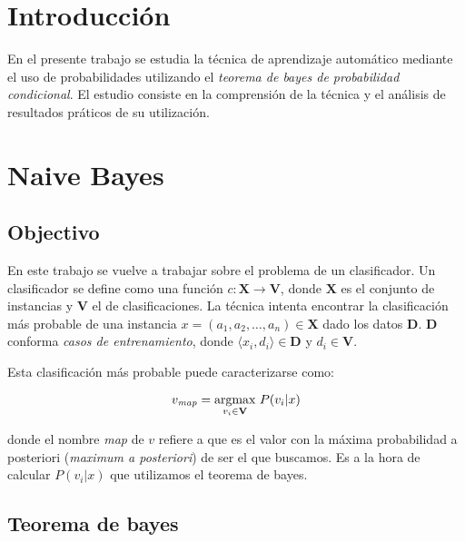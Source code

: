 \documentclass[a4paper,10pt]{article}
\begin{document}



\maketitle
\tableofcontents
\newpage

\section{Introducción}

En el presente trabajo se estudia la técnica de aprendizaje automático mediante el uso de probabilidades utilizando el \emph{teorema de bayes de probabilidad condicional}. El estudio consiste en la comprensión de la técnica y el análisis de resultados práticos de su utilización. 

\section{Naive Bayes}

\subsection{Objectivo}

En este trabajo se vuelve a trabajar sobre el problema de un clasificador. Un clasificador se define como una función $c : \mathbf{X} \rightarrow \mathbf{V}$, donde $\mathbf{X}$ es el conjunto de instancias y $\mathbf{V}$ el de clasificaciones. La técnica intenta encontrar la clasificación más probable de una instancia $x = (a_1, a_2, \dots, a_n) \in \mathbf{X}$ dado los datos $\mathbf{D}$. $\mathbf{D}$ conforma \emph{casos de entrenamiento}, donde $\langle x_i, d_i \rangle \in \mathbf{D}$ y $d_i \in \mathbf{V}$.

Esta clasificación más probable puede caracterizarse como: 

$$ v_{\text{\emph{map}}} = \underset{v_i \in \mathbf{V}}{\text{argmax}}\  P(v_i | x) $$

donde el nombre \emph{map} de $v$ refiere a que es el valor con la máxima probabilidad a posteriori (\emph{maximum a posteriori}) de ser el que buscamos. Es a la hora de calcular $P(v_i | x)$ que utilizamos el teorema de bayes.

\subsection{Teorema de bayes}
\end{document}
